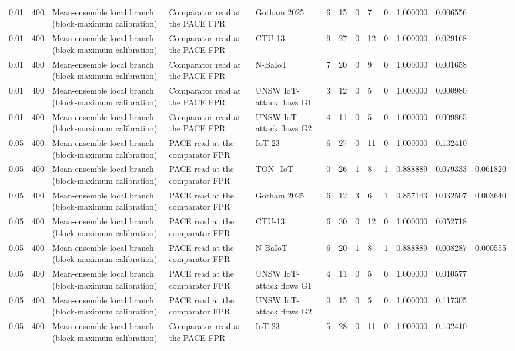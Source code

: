 \begin{tabular}{lllllllllllll}
0.01 & 400 & Mean-ensemble local branch (block-maximum calibration) & Comparator read at the PACE FPR & Gotham 2025 & 6 & 15 & 0 & 7 & 0 & 1.000000 & 0.006556 &  \\
0.01 & 400 & Mean-ensemble local branch (block-maximum calibration) & Comparator read at the PACE FPR & CTU-13 & 9 & 27 & 0 & 12 & 0 & 1.000000 & 0.029168 &  \\
0.01 & 400 & Mean-ensemble local branch (block-maximum calibration) & Comparator read at the PACE FPR & N-BaIoT & 7 & 20 & 0 & 9 & 0 & 1.000000 & 0.001658 &  \\
0.01 & 400 & Mean-ensemble local branch (block-maximum calibration) & Comparator read at the PACE FPR & UNSW IoT-attack flows G1 & 3 & 12 & 0 & 5 & 0 & 1.000000 & 0.000980 &  \\
0.01 & 400 & Mean-ensemble local branch (block-maximum calibration) & Comparator read at the PACE FPR & UNSW IoT-attack flows G2 & 4 & 11 & 0 & 5 & 0 & 1.000000 & 0.009865 &  \\
0.05 & 400 & Mean-ensemble local branch (block-maximum calibration) & PACE read at the comparator FPR & IoT-23 & 6 & 27 & 0 & 11 & 0 & 1.000000 & 0.132410 &  \\
0.05 & 400 & Mean-ensemble local branch (block-maximum calibration) & PACE read at the comparator FPR & TON\_IoT & 0 & 26 & 1 & 8 & 1 & 0.888889 & 0.079333 & 0.061820 \\
0.05 & 400 & Mean-ensemble local branch (block-maximum calibration) & PACE read at the comparator FPR & Gotham 2025 & 6 & 12 & 3 & 6 & 1 & 0.857143 & 0.032507 & 0.003640 \\
0.05 & 400 & Mean-ensemble local branch (block-maximum calibration) & PACE read at the comparator FPR & CTU-13 & 6 & 30 & 0 & 12 & 0 & 1.000000 & 0.052718 &  \\
0.05 & 400 & Mean-ensemble local branch (block-maximum calibration) & PACE read at the comparator FPR & N-BaIoT & 6 & 20 & 1 & 8 & 1 & 0.888889 & 0.008287 & 0.000555 \\
0.05 & 400 & Mean-ensemble local branch (block-maximum calibration) & PACE read at the comparator FPR & UNSW IoT-attack flows G1 & 4 & 11 & 0 & 5 & 0 & 1.000000 & 0.010577 &  \\
0.05 & 400 & Mean-ensemble local branch (block-maximum calibration) & PACE read at the comparator FPR & UNSW IoT-attack flows G2 & 0 & 15 & 0 & 5 & 0 & 1.000000 & 0.117305 &  \\
0.05 & 400 & Mean-ensemble local branch (block-maximum calibration) & Comparator read at the PACE FPR & IoT-23 & 5 & 28 & 0 & 11 & 0 & 1.000000 & 0.132410 &  \\

\end{tabular}
